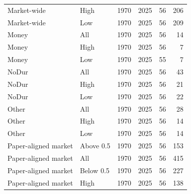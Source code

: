 \documentclass[10pt]{article}
\begin{document}
\begin{landscape}
\begin{longtable}{llrrrr}
Market-wide & High & 1970 & 2025 & 56 & 206 \\
Market-wide & Low & 1970 & 2025 & 56 & 209 \\
Money & All & 1970 & 2025 & 56 & 14 \\
Money & High & 1970 & 2025 & 56 & 7 \\
Money & Low & 1970 & 2025 & 55 & 7 \\
NoDur & All & 1970 & 2025 & 56 & 43 \\
NoDur & High & 1970 & 2025 & 56 & 21 \\
NoDur & Low & 1970 & 2025 & 56 & 22 \\
Other & All & 1970 & 2025 & 56 & 28 \\
Other & High & 1970 & 2025 & 56 & 14 \\
Other & Low & 1970 & 2025 & 56 & 14 \\
Paper-aligned market & Above 0.5 & 1970 & 2025 & 56 & 153 \\
Paper-aligned market & All & 1970 & 2025 & 56 & 415 \\
Paper-aligned market & Below 0.5 & 1970 & 2025 & 56 & 227 \\
Paper-aligned market & High & 1970 & 2025 & 56 & 138 \\
\end{longtable}


\end{landscape}
\end{document}
